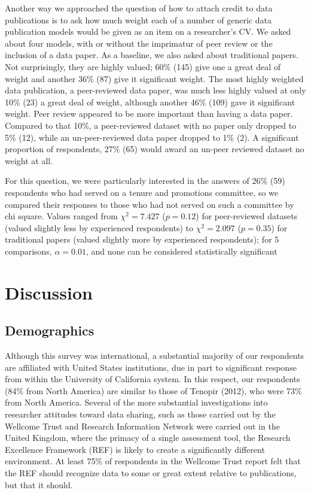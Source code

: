 \documentclass[10pt]{article}
\begin{document}
Another way we approached the question of how to attach credit to data publications is to ask how much weight each of a number of generic data publication models would be given as an item on a researcher's CV.
We asked about four models, with or without the imprimatur of peer review or the inclusion of a data paper. 
As a baseline, we also asked about traditional papers.
Not surprisingly, they are highly valued; 60\% (145) give one a great deal of weight and another 36\% (87) give it significant weight.
The most highly weighted data publication, a peer-reviewed data paper, was much less highly valued at only 10\% (23) a great deal of weight, although another 46\% (109) gave it significant weight.
Peer review appeared to be more important than having a data paper. 
Compared to that 10\%, a peer-reviewed dataset with no paper only dropped to 5\% (12), while an un-peer-reviewed data paper dropped to 1\% (2).
A significant proportion of respondents, 27\% (65) would award an un-peer reviewed dataset no weight at all.

For this question, we were particularly interested in the answers of 26\% (59) respondents who had served on a tenure and promotions committee, so we compared their responses to those who had not served on such a committee by chi square.
Values ranged from $\chi^{2}= 7.427$ ($p= 0.12$) for peer-reviewed datasets (valued slightly less by experienced respondents) to $\chi^{2}= 2.097$ ($p= 0.35$) for traditional papers (valued slightly more by experienced respondents); for 5 comparisons, $\alpha=0.01$, and none can be considered statistically significant


\section*{Discussion}

\subsection*{Demographics}

Although this survey was international, a substantial majority of our respondents are affiliated with United States institutions, due in part to significant response from within the University of California system.
In this respect, our respondents (84\% from North America) are similar to those of Tenopir (2012), who were 73\% from North America.
Several of the more substantial investigations into researcher attitudes toward data sharing, such as those carried out by the Wellcome Trust\cite{bobrow_establishing_2014} and Research Information Network\cite{swan_share_2008} were carried out in the United Kingdom, where the primacy of a single assessment tool, the Research Excellence Framework (REF) is likely to create a significantly different environment.
At least 75\% of respondents in the Wellcome Trust report felt that the REF should recognize data to some or great extent relative to publications, but that it should.
\end{document}
